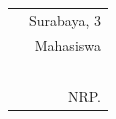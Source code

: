 \vfill

\noindent
\begin{tabularx}{\textwidth}{X r}
	& Surabaya, 3 \MONTH{} \the\year{} \\
	& Mahasiswa \\
	& \\
	& \\
	& \\
	& \\ %
	& \textbf{\name{}} \\
	& NRP. \nrp{}
\end{tabularx}

\clearpage